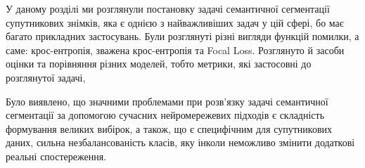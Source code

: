 \chapconclude{\ref{chap:sem_segm}}
У даному розділі ми розглянули постановку задачі семантичної сегментації
супутникових знімків, яка є однією з найважливіших
задач у цій сфері, бо має багато прикладних застосувань.
Були розглянуті різні вигляди функцій помилки, а саме: крос-ентропія,
зважена крос-ентропія та Focal Loss.
Розглянуто й засоби оцінки та порівняння різних моделей, тобто
метрики, які застосовні до розглянутої задачі,

Було виявлено, що значними проблемами при
розв'язку задачі семантичної сегментації за
допомогою сучасних нейромережевих підходів є
складність формування великих вибірок, а також,
що є специфічним для супутникових даних, сильна
незбалансованість класів, яку інколи неможливо
змінити додаткові реальні спостереження.


